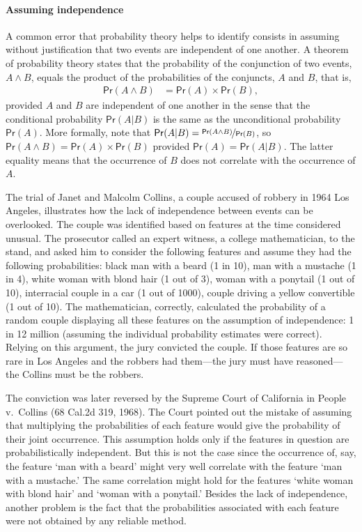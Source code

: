 \documentclass{article}
\newcommand{\pr}{\mathsf{Pr}}
\begin{document}
\paragraph{Assuming independence}

A common error that probability theory helps to identify consists in assuming without justification that two events are independent of one another.  
A theorem of probability theory states that the probability of the conjunction of two events, $A\wedge B$, equals the product of the probabilities of the conjuncts, $A$ and $B$, that is, 
\begin{align*}
\pr(A \wedge B) & = \pr(A)\times \pr(B),
\end{align*}
\noindent provided  $A$ and $B$ are independent of one another in the sense that the conditional probability $\pr(A | B)$ is the same as the unconditional probability $\pr(A)$. More formally, note that $\pr(A \vert B)=\nicefrac{\pr(A \wedge B)}{\pr(B)}$, so
$\pr(A \wedge B)=\pr(A)\times \pr(B)$
provided $\pr(A)=\pr(A \vert B)$. The latter equality means that the occurrence of $B$ does not correlate with the occurrence of $A$. 



The trial of Janet and Malcolm Collins, a couple accused of robbery in 1964 Los Angeles, illustrates how 
the lack of independence between events can be overlooked. The couple was identified based on features at the time considered unusual. The prosecutor called an expert witness, a college mathematician, to the stand, and asked him to consider the following features and assume they had the following  probabilities: black man with a beard (1 in 10), man with a mustache (1 in 4), white woman with blond hair (1 out of 3), woman with a ponytail (1 out of 10), interracial couple in a car (1 out of 1000), couple driving a yellow convertible (1 out of 10). The mathematician, correctly, calculated the probability of a random couple displaying all these features on the assumption of independence: 1 in 12 million (assuming the individual probability estimates were correct). Relying on this argument, the jury convicted the couple. If  those features are so rare in Los Angeles and the robbers had them---the jury must have reasoned---the Collins must be the robbers. 

The conviction was later reversed by the Supreme Court of California in People v.\ Collins (68 Cal.2d 319, 1968). 
The Court pointed out the mistake
of assuming that multiplying the probabilities of each feature would give the probability of their joint occurrence. This assumption holds only if the features in question are probabilistically independent. 
But this is not the case since the occurrence of, say, the feature `man with a beard' might very well correlate with the feature `man with a mustache.' The same correlation might hold for the features 
 `white woman with blond hair' and
 `woman with a ponytail.' Besides the lack of independence, another problem is the fact that 
the probabilities associated with each feature were not obtained by any reliable method. 
\end{document}
